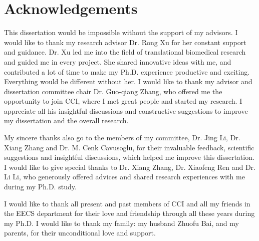 
\newpage
\section*{Acknowledgements}
This dissertation would be impossible without the support of my advisors.
I would like to thank my research advisor Dr. Rong Xu for her constant support and guidance.
Dr. Xu led me into the field of translational biomedical research and guided me in every project.
She shared innovative ideas with me, and contributed a lot of time to make my Ph.D. experience productive and exciting.
Everything would be different without her.
I would like to thank my advisor and dissertation committee chair Dr. Guo-qiang Zhang, who offered me
the opportunity to join CCI, where I met great people and started my research.
I appreciate all his insightful discussions and constructive suggestions to improve my dissertation and the overall research.

My sincere thanks also go to the members of my committee, Dr. Jing Li, Dr. Xiang Zhang and Dr. M. Cenk Cavusoglu, for
their invaluable feedback, scientific suggestions and insightful discussions, which helped me improve this dissertation.
I would like to give special thanks to Dr. Xiang Zhang,  Dr. Xiaofeng Ren and Dr. Li Li, who generously offered
advices and shared research experiences with me during my Ph.D. study.

I would like to thank all present and past members of CCI and all my friends in the EECS department for their love
and friendship through all these years during my Ph.D. I would like to thank my family:
my husband Zhuofu Bai, and my parents, for their unconditional love and support.


